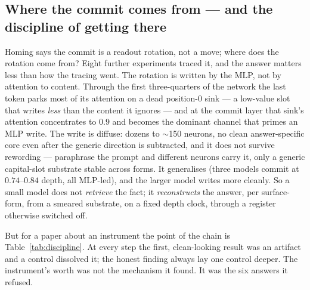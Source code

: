 \documentclass[11pt,a4paper]{article}
\begin{document}
\subsection{Where the commit comes from --- and the discipline of getting there}

Homing says the commit is a readout rotation, not a move; where does the rotation come
from? Eight further experiments traced it, and the answer matters less than how the
tracing went. The rotation is written by the MLP, not by attention to content. Through
the first three-quarters of the network the last token parks most of its attention on a
dead position-0 sink --- a low-value slot that writes \emph{less} than the content it
ignores --- and at the commit layer that sink's attention concentrates to $0.9$ and
becomes the dominant channel that primes an MLP write. The write is diffuse: dozens to
$\sim$150 neurons, no clean answer-specific core even after the generic direction is
subtracted, and it does not survive rewording --- paraphrase the prompt and different
neurons carry it, only a generic capital-slot substrate stable across forms. It
generalises (three models commit at $0.74$--$0.84$ depth, all MLP-led), and the larger
model writes more cleanly. So a small model does not \emph{retrieve} the fact; it
\emph{reconstructs} the answer, per surface-form, from a smeared substrate, on a fixed
depth clock, through a register otherwise switched off.

But for a paper about an instrument the point of the chain is Table~\ref{tab:discipline}.
At every step the first, clean-looking result was an artifact and a control dissolved it;
the honest finding always lay one control deeper. The instrument's worth was not the
mechanism it found. It was the six answers it refused.
\end{document}
